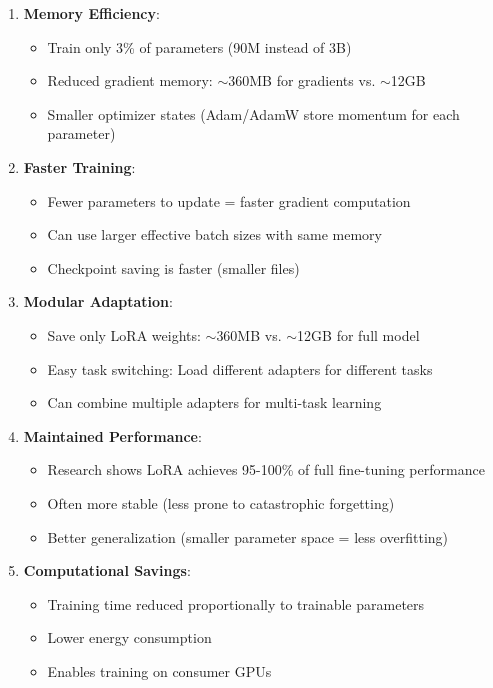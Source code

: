 \documentclass[conference]{IEEEtran}
\begin{document}
\begin{enumerate}
    \item \textbf{Memory Efficiency}: 
    \begin{itemize}
        \item Train only 3\% of parameters (90M instead of 3B)
        \item Reduced gradient memory: $\sim$360MB for gradients vs. $\sim$12GB
        \item Smaller optimizer states (Adam/AdamW store momentum for each parameter)
    \end{itemize}
    
    \item \textbf{Faster Training}: 
    \begin{itemize}
        \item Fewer parameters to update = faster gradient computation
        \item Can use larger effective batch sizes with same memory
        \item Checkpoint saving is faster (smaller files)
    \end{itemize}
    
    \item \textbf{Modular Adaptation}: 
    \begin{itemize}
        \item Save only LoRA weights: $\sim$360MB vs. $\sim$12GB for full model
        \item Easy task switching: Load different adapters for different tasks
        \item Can combine multiple adapters for multi-task learning
    \end{itemize}
    
    \item \textbf{Maintained Performance}: 
    \begin{itemize}
        \item Research shows LoRA achieves 95-100\% of full fine-tuning performance
        \item Often more stable (less prone to catastrophic forgetting)
        \item Better generalization (smaller parameter space = less overfitting)
    \end{itemize}
    
    \item \textbf{Computational Savings}:
    \begin{itemize}
        \item Training time reduced proportionally to trainable parameters
        \item Lower energy consumption
        \item Enables training on consumer GPUs
    \end{itemize}
\end{enumerate}
\end{document}
